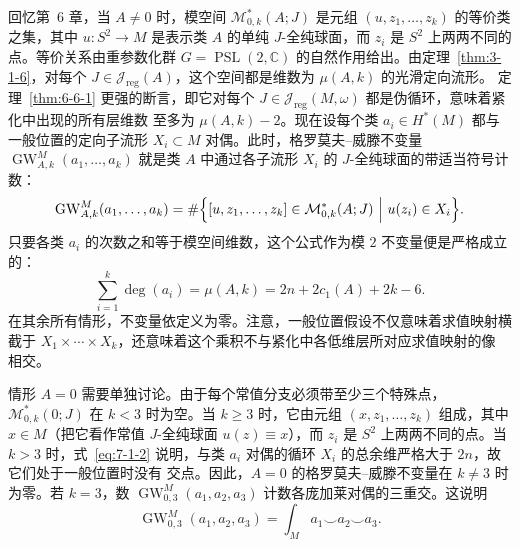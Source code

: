 回忆第~6 章，当 $A\ne0$ 时，模空间 $\mathcal M^*_{0,k}(A;J)$ 是元组
$(u,z_1,\ldots,z_k)$ 的等价类之集，其中 $u:S^2\to M$ 是表示类 $A$ 的单纯
$J$-全纯球面，而 $z_i$ 是 $S^2$ 上两两不同的点。等价关系由重参数化群
$G=\operatorname{PSL}(2,\mathbb C)$ 的自然作用给出。由定理~\ref{thm:3-1-6}，对每个
$J\in\mathcal J_{\mathrm{reg}}(A)$，这个空间都是维数为 $\mu(A,k)$ 的光滑定向流形。
定理~\ref{thm:6-6-1} 更强的断言，即它对每个
$J\in\mathcal J_{\mathrm{reg}}(M,\omega)$ 都是伪循环，意味着紧化中出现的所有层维数
至多为 $\mu(A,k)-2$。现在设每个类 $a_i\in H^*(M)$ 都与一般位置的定向子流形
$X_i\subset M$ 对偶。此时，格罗莫夫--威滕不变量
$\operatorname{GW}^{M}_{A,k}(a_1,\ldots,a_k)$ 就是类 $A$ 中通过各子流形 $X_i$ 的
$J$-全纯球面的带适当符号计数：
\[
  \operatorname{GW}^{M}_{A,k}(a_1,\ldots,a_k)
  =\#\Bigl\{[u,z_1,\ldots,z_k]\in\mathcal M^*_{0,k}(A;J)
  \ \Big|\ u(z_i)\in X_i\Bigr\}.
\]
只要各类 $a_i$ 的次数之和等于模空间维数，这个公式作为模 $2$ 不变量便是严格成立的：
\begin{equation}\label{eq:7-1-2}
  \sum_{i=1}^k\deg(a_i)=\mu(A,k)=2n+2c_1(A)+2k-6.
\end{equation}
在其余所有情形，不变量依定义为零。注意，一般位置假设不仅意味着求值映射横截于
$X_1\times\cdots\times X_k$，还意味着这个乘积不与紧化中各低维层所对应求值映射的像
相交。

\begin{example}\label{ex:7-1-3}
情形 $A=0$ 需要单独讨论。由于每个常值分支必须带至少三个特殊点，
$\mathcal M^*_{0,k}(0;J)$ 在 $k<3$ 时为空。当 $k\ge3$ 时，它由元组
$(x,z_1,\ldots,z_k)$ 组成，其中 $x\in M$（把它看作常值 $J$-全纯球面
$u(z)\equiv x$），而 $z_i$ 是 $S^2$ 上两两不同的点。当 $k>3$ 时，式~\eqref{eq:7-1-2}
说明，与类 $a_i$ 对偶的循环 $X_i$ 的总余维严格大于 $2n$，故它们处于一般位置时没有
交点。因此，$A=0$ 的格罗莫夫--威滕不变量在 $k\ne3$ 时为零。若 $k=3$，数
$\operatorname{GW}^{M}_{0,3}(a_1,a_2,a_3)$ 计数各庞加莱对偶的三重交。这说明
\[
  \operatorname{GW}^{M}_{0,3}(a_1,a_2,a_3)
  =\int_M a_1\smile a_2\smile a_3.
\]
\end{example}

